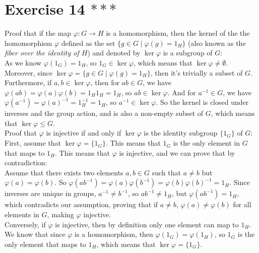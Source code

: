 \documentclass[12pt]{article}
\begin{document}
    \section*{Exercise 14 $***$}
    Proof that if the map $\varphi: G \to H$ is a homomorphism,
    then the kernel of the the homomorphism $\varphi$ defined as the set
    $\{g \in G \mid \varphi(g) = 1_H\}$ (also known as the
    \textit{fiber over the identity of $H$})
    and denoted by $\ker \varphi$ is a subgroup of $G$: \\
    As we know $\varphi(1_G) = 1_H$, so $1_G \in \ker \varphi$,
    which means that $\ker \varphi \neq \emptyset$.
    Moreover, since $\ker \varphi = \{g \in G \mid \varphi(g) = 1_H\}$,
    then it's trivially a subset of $G$.
    Furthermore, if $a, b \in \ker \varphi$,
    then for $ab \in G$,
    we have $\varphi(ab) = \varphi(a)\varphi(b) = 1_H1_H = 1_H$,
    so $ab \in \ker \varphi$.
    And for $a^{-1} \in G$,
    we have $\varphi(a^{-1}) = \varphi(a)^{-1} = 1_H^{-1} = 1_H$,
    so $a^{-1} \in \ker \varphi$.
    So the kernel is closed under inverses and the group action,
    and is also a non-empty subset of $G$,
    which means that $\ker \varphi \leqslant G$. \\
    Proof that $\varphi$ is injective if and only if
    $\ker \varphi$ is the identity subgroup $\{1_G\}$ of $G$: \\
    First, assume that $\ker \varphi = \{1_G\}$.
    This means that $1_G$ is the only element in $G$ that maps to $1_H$.
    This means that $\varphi$ is injective,
    and we can prove that by contradiction: \\
    Assume that there exists two elements $a, b \in G$
    such that $a \neq b$ but $\varphi(a) = \varphi(b)$.
    So $\varphi(ab^{-1}) = \varphi(a)\varphi(b^{-1})
    = \varphi(b)\varphi(b)^{-1} = 1_H$.
    Since inverses are unique in groups, $a^{-1} \neq b^{-1}$,
    so $ab^{-1} \neq 1_H$, but $\varphi(ab^{-1}) = 1_H$,
    which contradicts our assumption,
    proving that if $a \neq b$, $\varphi(a) \neq \varphi(b)$
    for all elements in $G$,
    making $\varphi$ injective. \\ 
    Conversely, if $\varphi$ is injective,
    then by definition only one element can map to $1_H$.
    We know that since $\varphi$ is a homomorphism,
    then $\varphi(1_G) = \varphi(1_H)$,
    so $1_G$ is the only element that maps to $1_H$,
    which means that $\ker \varphi = \{1_G\}$. 
\end{document}
